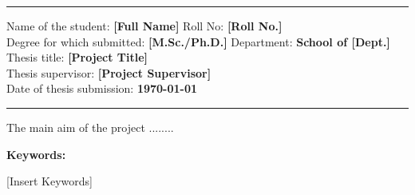 \vspace{6pt}
\begin{flushleft}
    \setlength{\parskip}{0pt}
    { \par}
    \bigskip
    \vspace{6pt}
    \hrule \vspace{0.4cm} %
		  Name of the student:	 \textbf{[Full Name]}	\hfill Roll No: \textbf{[Roll No.]} \\
		Degree for which submitted:  \textbf{[M.Sc./Ph.D.]} \hfill Department:  \textbf{School of [Dept.]} \\
		Thesis title: \textbf{[Project Title]}\\
		Thesis supervisor:  \textbf{[Project Supervisor]}\\
		Date of thesis submission: \textbf{{\large \today}\\[0.4cm] }
	\hrule \vspace{1.5cm} %
\end{flushleft} %

The main aim of the project ........

\vspace{3cm} %

{\Large \textbf{Keywords: }}\par{\Large [Insert Keywords]}
\vfill
\clearpage